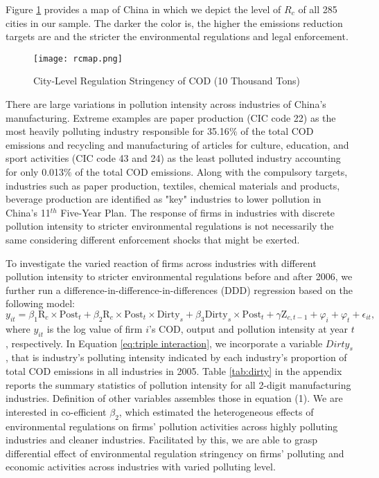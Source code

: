 \documentclass[12pt,english]{article}
\begin{document}
Figure \ref{fig:rcmap} provides a map of China in which we depict the level of ${R}_{c}$ of all 285 cities in our sample. The darker the color is, the higher the emissions reduction targets are and the stricter the environmental regulations and legal enforcement.
\begin{figure}[htbp]
	\caption{City-Level Regulation Stringency of COD (10 Thousand Tons)}
	\label{fig:rcmap}
	\centering
	\texttt{[image: rcmap.png]}
\end{figure}

There are large variations in pollution intensity across industries of China's manufacturing. Extreme examples are paper production (CIC code 22) as the most heavily polluting industry responsible for 35.16$\%$ of the total COD emissions and recycling and manufacturing of articles for culture, education, and sport activities (CIC code 43 and 24) as the least polluted industry accounting for only 0.013$\%$ of the total COD emissions. Along with the compulsory targets, industries such as paper production, textiles, chemical materials and products, beverage production are identified as "key" industries to lower pollution in China's 11$^{th}$ Five-Year Plan. The response of firms in industries with discrete pollution intensity to stricter environmental regulations is not necessarily the same considering different enforcement shocks that might be exerted.

To investigate the varied reaction of firms across industries with different pollution intensity to stricter environmental regulations before and after 2006, we further run a difference-in-difference-in-differences (DDD) regression based on the following model:
\begin{equation} \label{eq:triple interaction}
y_{it}=\beta_1 \text{R}_{c} \times \text{Post}_{t} +\beta_2 \text{R}_{c} \times \text{Post}_{t} \times \text{Dirty}_{s}  +\beta_3 \text{Dirty}_{s} \times \text{Post}_{t} + \gamma\text{Z}_{c,t-1} +\varphi_i+\varphi_{t} +\epsilon_{it},
\end{equation}
where $y_{it}$ is the log value of firm $i$'s COD, output and pollution intensity at year $t$, respectively. In Equation \ref{eq:triple interaction}, we incorporate a variable ${{Dirty}_{s}}$, that is industry's polluting intensity indicated by each industry's proportion of total COD emissions in all industries in 2005. Table \ref{tab:dirty} in the appendix reports the summary statistics of pollution intensity for all 2-digit manufacturing industries. Definition of other variables assembles those in equation (1). We are interested in co-efficient $\beta_2$, which estimated the heterogeneous effects of environmental regulations on firms' pollution activities across highly polluting industries and cleaner industries. Facilitated by this, we are able to grasp differential effect of environmental regulation stringency on firms' polluting and economic activities across industries with varied polluting level.
\end{document}
